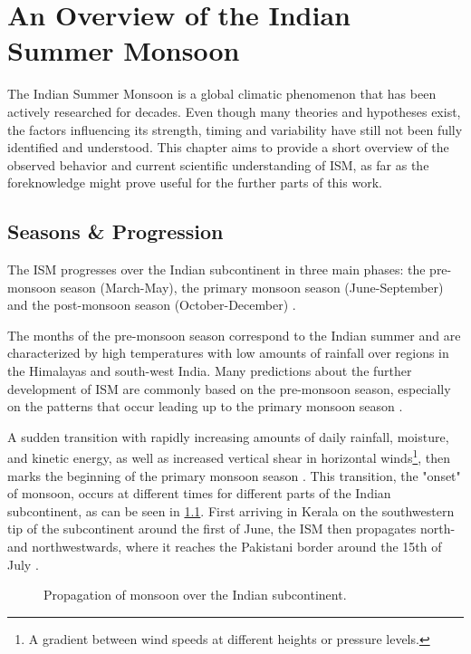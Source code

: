 \chapter{An Overview of the Indian Summer Monsoon}
\label{c:ism_overview}
The Indian Summer Monsoon is a global climatic phenomenon that has been actively researched for decades. Even though many theories and hypotheses exist, the factors influencing its strength, timing and variability have still not been fully identified and understood. This chapter aims to provide a short overview of the observed behavior and current scientific understanding of ISM, as far as the foreknowledge might prove useful for the further parts of this work.

\section{Seasons \& Progression}
\label{st:ism_seasons}
The ISM progresses over the Indian subcontinent in three main phases: the pre-monsoon season (March-May), the primary monsoon season (June-September) and the post-monsoon season (October-December) \citep{Stolbova.2015}.

The months of the pre-monsoon season correspond to the Indian summer and are characterized by high temperatures with low amounts of rainfall over regions in the Himalayas and south-west India. Many predictions about the further development of ISM are commonly based on the pre-monsoon season, especially on the patterns that occur leading up to the primary monsoon season \citep{Stolbova.2015}.

A sudden transition with rapidly increasing amounts of daily rainfall, moisture, and kinetic energy, as well as increased vertical shear in horizontal winds\footnote{A gradient between wind speeds at different heights or pressure levels.}, then marks the beginning of the primary monsoon season \citep{Pradhan.2017}. This transition, the "onset" of monsoon, occurs at different times for different parts of the Indian subcontinent, as can be seen in \cref{fig:onset_propagation}. First arriving in Kerala on the southwestern tip of the subcontinent around the first of June, the ISM then propagates north- and northwestwards, where it reaches the Pakistani border around the 15th of July \citep{Willetts.2017}.

\begin{figure}[h]
  \caption{Propagation of monsoon over the Indian subcontinent.}
  \label{fig:onset_propagation}
\end{figure}

